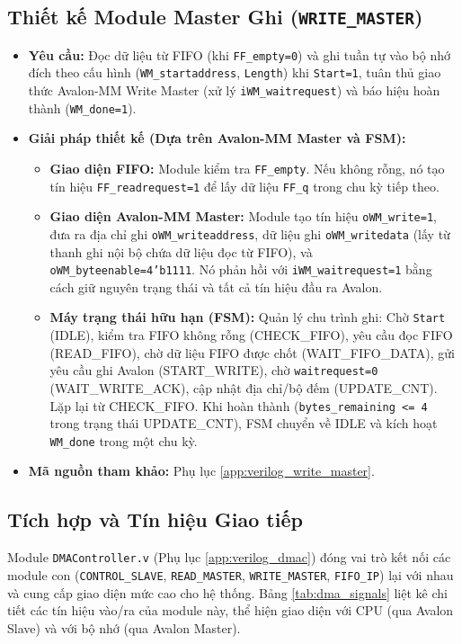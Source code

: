 \subsection{Thiết kế Module Master Ghi (\texttt{WRITE\_MASTER})}
\begin{itemize}
    \item \textbf{Yêu cầu:} Đọc dữ liệu từ FIFO (khi \texttt{FF\_empty=0}) và ghi tuần tự vào bộ nhớ đích theo cấu hình (\texttt{WM\_startaddress}, \texttt{Length}) khi \texttt{Start=1}, tuân thủ giao thức Avalon-MM Write Master (xử lý \texttt{iWM\_waitrequest}) và báo hiệu hoàn thành (\texttt{WM\_done=1}).
    \item \textbf{Giải pháp thiết kế (Dựa trên Avalon-MM Master và FSM):}
        \begin{itemize}
            \item \textbf{Giao diện FIFO:} Module kiểm tra \texttt{FF\_empty}. Nếu không rỗng, nó tạo tín hiệu \texttt{FF\_readrequest=1} để lấy dữ liệu \texttt{FF\_q} trong chu kỳ tiếp theo.
            \item \textbf{Giao diện Avalon-MM Master:} Module tạo tín hiệu \texttt{oWM\_write=1}, đưa ra địa chỉ ghi \texttt{oWM\_writeaddress}, dữ liệu ghi \texttt{oWM\_writedata} (lấy từ thanh ghi nội bộ chứa dữ liệu đọc từ FIFO), và \texttt{oWM\_byteenable=4'b1111}. Nó phản hồi với \texttt{iWM\_waitrequest=1} bằng cách giữ nguyên trạng thái và tất cả tín hiệu đầu ra Avalon.
            \item \textbf{Máy trạng thái hữu hạn (FSM):} Quản lý chu trình ghi: Chờ \texttt{Start} (IDLE), kiểm tra FIFO không rỗng (CHECK\_FIFO), yêu cầu đọc FIFO (READ\_FIFO), chờ dữ liệu FIFO được chốt (WAIT\_FIFO\_DATA), gửi yêu cầu ghi Avalon (START\_WRITE), chờ \texttt{waitrequest=0} (WAIT\_WRITE\_ACK), cập nhật địa chỉ/bộ đếm (UPDATE\_CNT). Lặp lại từ CHECK\_FIFO. Khi hoàn thành (\texttt{bytes\_remaining <= 4} trong trạng thái UPDATE\_CNT), FSM chuyển về IDLE và kích hoạt \texttt{WM\_done} trong một chu kỳ.
        \end{itemize}
    \item \textbf{Mã nguồn tham khảo:} Phụ lục \ref{app:verilog_write_master}.
\end{itemize}

\subsection{Tích hợp và Tín hiệu Giao tiếp}
Module \texttt{DMAController.v} (Phụ lục \ref{app:verilog_dmac}) đóng vai trò kết nối các module con (\texttt{CONTROL\_SLAVE}, \texttt{READ\_MASTER}, \texttt{WRITE\_MASTER}, \texttt{FIFO\_IP}) lại với nhau và cung cấp giao diện mức cao cho hệ thống. Bảng \ref{tab:dma_signals} liệt kê chi tiết các tín hiệu vào/ra của module này, thể hiện giao diện với CPU (qua Avalon Slave) và với bộ nhớ (qua Avalon Master).

